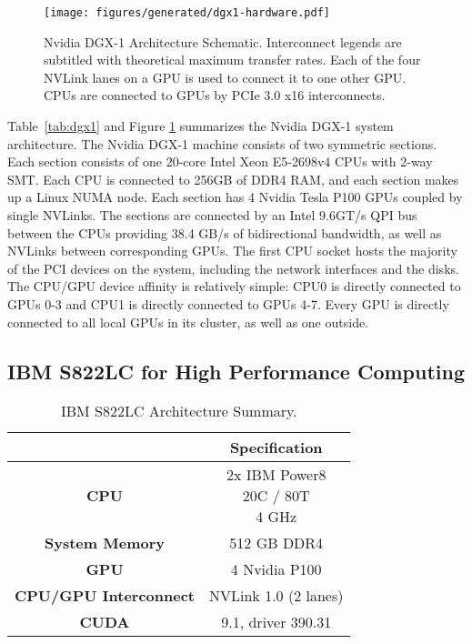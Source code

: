 \begin{figure}[ht]
    \centering
	\texttt{[image: figures/generated/dgx1-hardware.pdf]}
    \caption[Nvidia DGX-1 Architecture Schematic]{
		Nvidia DGX-1 Architecture Schematic.
		Interconnect legends are subtitled with theoretical maximum transfer rates.
		Each of the four NVLink lanes on a GPU is used to connect it to one other GPU.
		CPUs are connected to GPUs by PCIe 3.0 x16 interconnects.
	}
    \label{fig:topo-dgx-simple}
\end{figure}

Table~\ref{tab:dgx1} and Figure \ref{fig:topo-dgx-simple} summarizes the Nvidia DGX-1 system architecture.
The Nvidia DGX-1 machine consists of two symmetric sections\cite{nvidia2017dgx1}.
Each section consists of one 20-core Intel Xeon E5-2698v4 CPUs with 2-way SMT.
Each CPU is connected to 256GB of DDR4 RAM, and each section makes up a Linux NUMA node.
Each section has 4 Nvidia Tesla P100 GPUs coupled by single NVLinks.
The sections are connected by an Intel 9.6GT/s QPI bus between the CPUs providing 38.4 GB/s of bidirectional bandwidth, as well as NVLinks between corresponding GPUs.
The first CPU socket hosts the majority of the PCI devices on the system, including the network interfaces and the disks.
The CPU/GPU device affinity is relatively simple: CPU0 is directly connected to GPUs 0-3 and CPU1 is directly connected to GPUs 4-7.
Every GPU is directly connected to all local GPUs in its cluster, as well as one outside.

\subsection{IBM S822LC for High Performance Computing}
\label{sec:s822lc}

\begin{table}[ht]
    \centering
    \caption[IBM S822LC Architecture Summary]{IBM S822LC Architecture Summary.}
    \label{tab:minsky}
    \begin{tabular}{cc}
    \hline
    \textbf{}                     & \textbf{Specification}                         \\ \hline
    \textbf{CPU}                  & \makecell{2x IBM Power8 \\ 20C / 80T \\ 4 GHz} \\ \hline
    \textbf{System Memory}        & 512 GB DDR4                                    \\ \hline
	\textbf{GPU}                  & 4 Nvidia P100                                  \\ \hline
	\textbf{CPU/GPU Interconnect} & NVLink 1.0 (2 lanes)                           \\ \hline
	\textbf{CUDA}                 & 9.1, driver 390.31                             \\ \hline
    \end{tabular}
\end{table}

